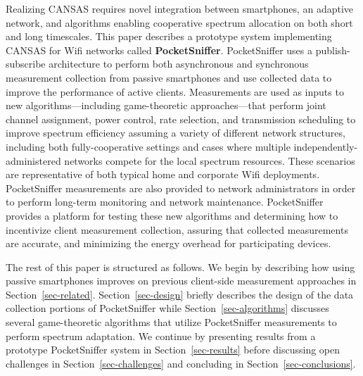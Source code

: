 Realizing CANSAS requires novel integration between smartphones, an adaptive
network, and algorithms enabling cooperative spectrum allocation on both
short and long timescales. This paper describes a prototype system
implementing CANSAS for Wifi networks called \textbf{PocketSniffer}.
PocketSniffer uses a publish-subscribe architecture to perform both
asynchronous and synchronous measurement collection from passive smartphones
and use collected data to improve the performance of active clients.
Measurements are used as inputs to new algorithms---including game-theoretic
approaches---that perform joint channel assignment, power control, rate
selection, and transmission scheduling to improve spectrum efficiency
assuming a variety of different network structures, including both
fully-cooperative settings and cases where multiple
independently-administered networks compete for the local spectrum resources.
These scenarios are representative of both typical home and corporate Wifi
deployments. PocketSniffer measurements are also provided to network
administrators in order to perform long-term monitoring and network
maintenance. PocketSniffer provides a platform for testing these new
algorithms and determining how to incentivize client measurement collection,
assuring that collected measurements are accurate, and minimizing the energy
overhead for participating devices.

The rest of this paper is structured as follows. We begin by describing how
using passive smartphones improves on previous client-side measurement
approaches in Section~\ref{sec-related}. Section~\ref{sec-design} briefly
describes the design of the data collection portions of PocketSniffer while
Section~\ref{sec-algorithms} discusses several game-theoretic algorithms that
utilize PocketSniffer measurements to perform spectrum adaptation. We
continue by presenting results from a prototype PocketSniffer system in
Section~\ref{sec-results} before discussing open challenges in
Section~\ref{sec-challenges} and concluding in Section~\ref{sec-conclusions}.
